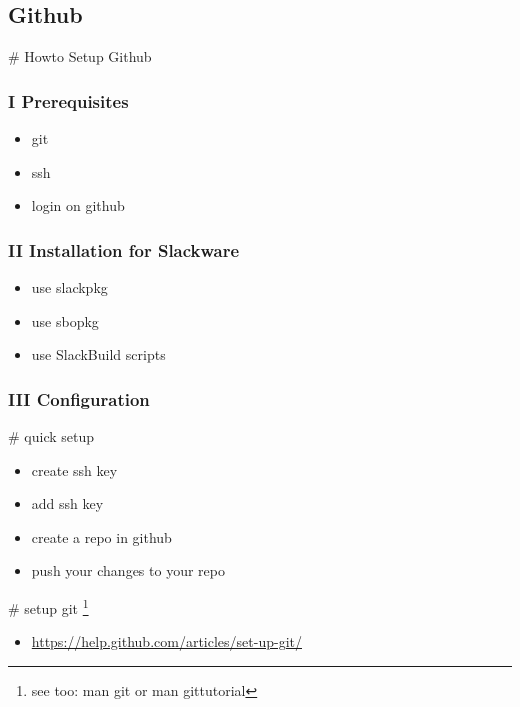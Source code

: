 \documentclass[letterpaper,10pt,english]{sphinxmanual}
\begin{document}
\subsection{Github}
\label{sdocs/github/github:github}\label{sdocs/github/github::doc}
\# Howto Setup Github


\subsubsection{I Prerequisites}
\label{sdocs/github/github:i-prerequisites}\begin{itemize}
\item {} 
git

\item {} 
ssh

\item {} 
login on github

\end{itemize}


\subsubsection{II Installation for Slackware}
\label{sdocs/github/github:ii-installation-for-slackware}\begin{itemize}
\item {} 
use slackpkg

\item {} 
use sbopkg

\item {} 
use SlackBuild scripts

\end{itemize}


\subsubsection{III Configuration}
\label{sdocs/github/github:iii-configuration}
\# quick setup
\begin{itemize}
\item {} 
create ssh key

\item {} 
add ssh key

\item {} 
create a repo in github

\item {} 
push your changes to your repo

\end{itemize}

\# setup git \footnote{
see too: man git or man gittutorial
}
\begin{itemize}
\item {} 
\href{https://help.github.com/articles/set-up-git/}{https://help.github.com/articles/set-up-git/}

\end{itemize}
\end{document}
